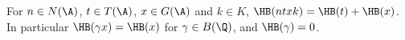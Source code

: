 For $n\in N(\A)$, $t\in T(\A)$, $x\in G(\A)$ and $k\in K$, $\HB(ntxk)=\HB(t)+\HB(x)$. In particular
$\HB(\gamma x)=\HB(x)$ for $\gamma\in B(\Q)$, and $\HB(\gamma)=0$.
